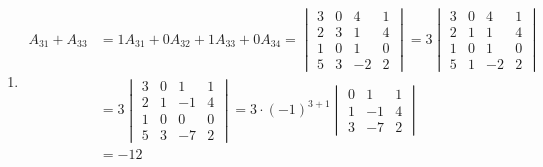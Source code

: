 \begin{enumerate}
\begin{enumerate}
              \item \begin{align*}
                        A_{31}+A_{33}
                         & = 1A_{31}+0A_{32}+1A_{33}+0A_{34}
                        = \begin{vmatrix}
                              3 & 0 & 4  & 1 \\
                              2 & 3 & 1  & 4 \\
                              1 & 0 & 1  & 0 \\
                              5 & 3 & -2 & 2
                          \end{vmatrix}
                        = 3 \begin{vmatrix}
                                3 & 0 & 4  & 1 \\
                                2 & 1 & 1  & 4 \\
                                1 & 0 & 1  & 0 \\
                                5 & 1 & -2 & 2
                            \end{vmatrix}              \\
                         & = 3 \begin{vmatrix}
                                   3 & 0 & 1  & 1 \\
                                   2 & 1 & -1 & 4 \\
                                   1 & 0 & 0  & 0 \\
                                   5 & 3 & -7 & 2
                               \end{vmatrix}
                        = 3 \cdot (-1)^{3+1} \begin{vmatrix}
                                                 0 & 1  & 1 \\
                                                 1 & -1 & 4 \\
                                                 3 & -7 & 2
                                             \end{vmatrix} \\
                         & = -12
                    \end{align*}


\end{enumerate}
\end{enumerate}
